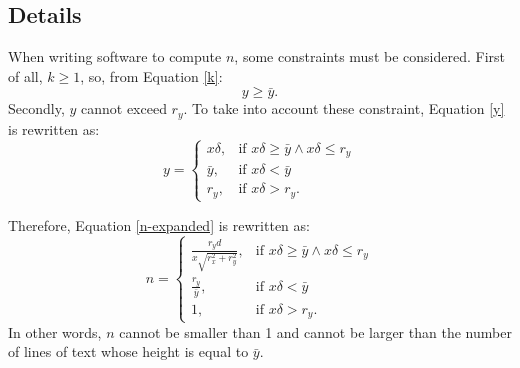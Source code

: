 \documentclass{article}
\begin{document}
\subsection{Details} \label{details}
When writing software to compute $n$, some constraints must be considered. First of all, $k \geq 1$, so, from Equation \eqref{k}:
\begin{equation}
y \geq \bar{y}.
\end{equation}
Secondly, $y$ cannot exceed $r_y$. To take into account these constraint, Equation \eqref{y} is rewritten as:
\begin{equation}
y = 
\begin{cases}
    x\delta,  & \text{if } x\delta \geq \bar{y} \land x\delta \leq r_y \\
    \bar{y},  & \text{if } x\delta < \bar{y} \\
	r_y,      & \text{if } x\delta > r_y.
\end{cases}
\end{equation}

Therefore, Equation \eqref{n-expanded} is rewritten as:
\begin{equation}
n = 
\begin{cases}
    \frac{r_yd}{x\sqrt{r_x^2+r_y^2}},  & \text{if } x\delta \geq \bar{y} \land x\delta \leq r_y \\
    \frac{r_y}{\bar{y}},  & \text{if } x\delta < \bar{y} \\
	1,      & \text{if } x\delta > r_y.
\end{cases}
\end{equation}
In other words, $n$ cannot be smaller than 1 and cannot be larger than the number of lines of text whose height is equal to $\bar{y}$.

\printbibliography
\end{document}
